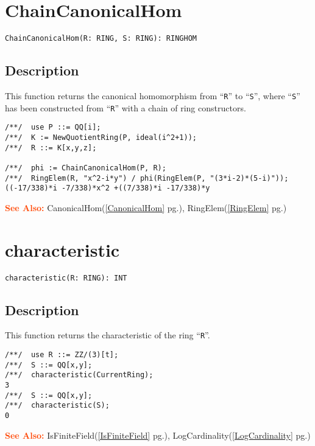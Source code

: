 \documentclass[a4paper]{mybook}
\newenvironment{command}{}{} %
\newcommand\SeeAlso{\par\textcolor{OrangeRed}{\textbf{\large See Also: }}}
\begin{document}
\section{ChainCanonicalHom}
\label{ChainCanonicalHom}
\begin{command} %


\begin{Verbatim}[label=syntax, rulecolor=\color{MidnightBlue},
frame=single]
ChainCanonicalHom(R: RING, S: RING): RINGHOM
\end{Verbatim}


\subsection*{Description}

This function returns the canonical homomorphism from ``\verb&R&'' to ``\verb&S&'',
where ``\verb&S&'' has been constructed from ``\verb&R&'' with a chain of
ring constructors.
\begin{Verbatim}[label=example, rulecolor=\color{PineGreen}, frame=single]
/**/  use P ::= QQ[i];
/**/  K := NewQuotientRing(P, ideal(i^2+1));
/**/  R ::= K[x,y,z];

/**/  phi := ChainCanonicalHom(P, R);
/**/  RingElem(R, "x^2-i*y") / phi(RingElem(P, "(3*i-2)*(5-i)"));
((-17/338)*i -7/338)*x^2 +((7/338)*i -17/338)*y
\end{Verbatim}


\SeeAlso %
  CanonicalHom(\ref{CanonicalHom} pg.\pageref{CanonicalHom}), 
    RingElem(\ref{RingElem} pg.\pageref{RingElem})
\end{command} %

\section{characteristic}
\label{characteristic}
\begin{command} %


\begin{Verbatim}[label=syntax, rulecolor=\color{MidnightBlue},
frame=single]
characteristic(R: RING): INT
\end{Verbatim}


\subsection*{Description}

This function returns the characteristic of the ring ``\verb&R&''.
\begin{Verbatim}[label=example, rulecolor=\color{PineGreen}, frame=single]
/**/  use R ::= ZZ/(3)[t];
/**/  S ::= QQ[x,y];
/**/  characteristic(CurrentRing);
3
/**/  S ::= QQ[x,y];
/**/  characteristic(S);
0
\end{Verbatim}


\SeeAlso %
  IsFiniteField(\ref{IsFiniteField} pg.\pageref{IsFiniteField}), 
    LogCardinality(\ref{LogCardinality} pg.\pageref{LogCardinality})
\end{command} %
\end{document}
